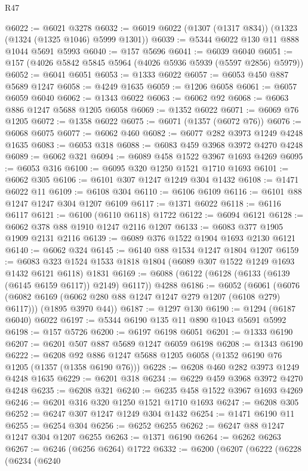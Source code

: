 \begin{lexlean}{R47}
\begin{coremodule}
@6022 := @6021 @3278
@6032 := @6019 @6022 (@1307 (@1317 @834)) (@1323 (@1324 (@1325 @1046) @5999 @1301))
@6039 := @5344 @6022 @130 @11 @888 @1044 @5691 @5993
@6040 := @157 @5696
@6041 := @6039 @6040
@6051 := @157 (@4026 @5842 @5845 @5964 (@4026 @5936 @5939 (@5597 @2856) @5979))
@6052 := @6041 @6051
@6053 := @1333 @6022
@6057 := @6053 @450 @887 @5689 @1247
@6058 := @4249 @1635
@6059 := @1206 @6058
@6061 := @6057 @6059 @6040
@6062 := @1343 @6022
@6063 := @6062 @92
@6068 := @6063 @886 @1247 @5688 @1205 @6058
@6069 := @1352 @6022
@6071 := @6069 @76 @1205
@6072 := @1358 @6022
@6075 := @6071 (@1357 (@6072 @76))
@6076 := @6068 @6075
@6077 := @6062 @460
@6082 := @6077 @282 @3973 @1249 @4248 @1635
@6083 := @6053 @318
@6088 := @6083 @459 @3968 @3972 @4270 @4248
@6089 := @6062 @321
@6094 := @6089 @458 @1522 @3967 @1693 @4269
@6095 := @6053 @316
@6100 := @6095 @320 @1250 @1521 @1710 @1693
@6101 := @6062 @305
@6106 := @6101 @307 @1247 @1249 @304 @1432
@6108 := @1471 @6022 @11
@6109 := @6108 @304
@6110 := @6106 @6109
@6116 := @6101 @88 @1247 @1247 @304 @1207 @6109
@6117 := @1371 @6022
@6118 := @6116 @6117
@6121 := @6100 (@6110 @6118) @1722
@6122 := @6094 @6121
@6128 := @6062 @378 @88 @1910 @1247 @2116 @1207
@6133 := @6083 @377 @1905 @1909 @2131 @2116
@6139 := @6089 @376 @1522 @1904 @1693 @2130 @6121
@6140 := @6062 @324
@6145 := @6140 @88 @1534 @1247 @1804 @1207
@6159 := @6083 @323 @1524 @1533 @1818 @1804 (@6089 @307 @1522 @1249 @1693 @1432 @6121 @6118) @1831
@6169 := @6088 (@6122 (@6128 (@6133 (@6139 (@6145 @6159 @6117)) @2149) @6117)) @4288
@6186 := @6052
    (@6061
      (@6076 (@6082 @6169 (@6062 @280 @88 @1247 @1247 @279 @1207 (@6108 @279) @6117)))
      (@1895 @3970 @44))
@6187 := @1297 @130
@6190 := @1294 (@6187 @6040) @6022
@6197 := @5344 @6190 @135 @11 @890 @1043 @5691 @5992
@6198 := @157 @5726
@6200 := @6197 @6198 @6051
@6201 := @1333 @6190
@6207 := @6201 @507 @887 @5689 @1247 @6059 @6198
@6208 := @1343 @6190
@6222 := @6208 @92 @886 @1247 @5688 @1205 @6058 (@1352 @6190 @76 @1205 (@1357 (@1358 @6190 @76)))
@6228 := @6208 @460 @282 @3973 @1249 @4248 @1635
@6229 := @6201 @318
@6234 := @6229 @459 @3968 @3972 @4270 @4248
@6235 := @6208 @321
@6240 := @6235 @458 @1522 @3967 @1693 @4269
@6246 := @6201 @316 @320 @1250 @1521 @1710 @1693
@6247 := @6208 @305
@6252 := @6247 @307 @1247 @1249 @304 @1432
@6254 := @1471 @6190 @11
@6255 := @6254 @304
@6256 := @6252 @6255
@6262 := @6247 @88 @1247 @1247 @304 @1207 @6255
@6263 := @1371 @6190
@6264 := @6262 @6263
@6267 := @6246 (@6256 @6264) @1722
@6332 := @6200
    (@6207
      (@6222
        (@6228
          (@6234
            (@6240

\end{coremodule}
\end{lexlean}
